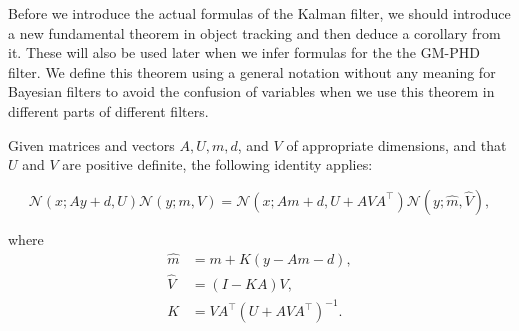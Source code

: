Before we introduce the actual formulas of the Kalman filter, we should introduce a new fundamental theorem in object tracking and then deduce a corollary from it. These will also be used later when we infer formulas for the the GM-PHD filter. We define this theorem using a general notation without any meaning for Bayesian filters to avoid the confusion of variables when we use this theorem in different parts of different filters.

\begin{theorem}\label{theorem:gaussian-identity}
    Given matrices and vectors $A, U, m, d$, and $V$ of appropriate dimensions, and that $U$ and $V$ are positive definite, the following identity applies:

    \begin{equation}\label{eq:gid}
        \mathscr{N}(x ; A y + d, U) \mathscr{N}(y ; m, V)=\mathscr{N}(x ; A m + d, U + A V A^\intercal) \mathscr{N}(y ; \hat{m}, \hat{V}),
    \end{equation}

    where
    \begin{align}
        \hat{m} & = m + K (y - Am - d), \\ 
        \hat{V} & = (I - K A) V, \\
        K &= V A^\intercal (U + A V A^\intercal)^{-1}.
    \end{align}
\end{theorem}

